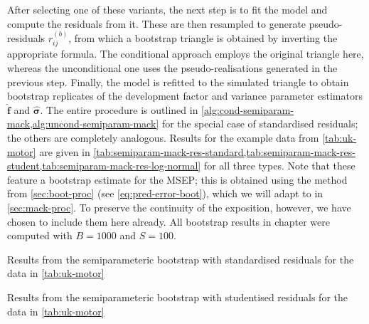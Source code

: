 \documentclass[a4paper]{book}
\begin{document}
After selecting one of these variants, the next step is to fit the model and compute the residuals from it. These are then resampled to generate pseudo-residuals $r^{(b)}_{ij}$, from which a bootstrap triangle is obtained by inverting the appropriate formula. The conditional approach employs the original triangle here, whereas the unconditional one uses the pseudo-realisations generated in the previous step. Finally, the model is refitted to the simulated triangle to obtain bootstrap replicates of the development factor and variance parameter estimators $\widehat{\bm{f}}$ and $\widehat{\bm{\sigma}}$. The entire procedure is outlined in \cref{alg:cond-semiparam-mack,alg:uncond-semiparam-mack} for the special case of standardised residuals; the others are completely analogous. Results for the example data from \cref{tab:uk-motor} are given in \cref{tab:semiparam-mack-res-standard,tab:semiparam-mack-res-student,tab:semiparam-mack-res-log-normal} for all three types. Note that these feature a bootstrap estimate for the MSEP; this is obtained using the method from \cref{sec:boot-proc} (see \cref{eq:pred-error-boot}), which we will adapt to  in \cref{sec:mack-proc}. To preserve the continuity of the exposition, however, we have chosen to include them here already. All bootstrap results in chapter were computed with $B = 1000$ and $S = 100$.

\begin{table}[!htb]
  \begin{subtable}{0.5\linewidth}
    
  \end{subtable}
  \hfill
  \begin{subtable}{0.5\linewidth}
    
  \end{subtable}
  \caption{Results from the semiparameteric bootstrap with standardised residuals for the data in \cref{tab:uk-motor}}
  \label{tab:semiparam-mack-res-standard}
\end{table}

\begin{table}[!htb]
  \begin{subtable}{0.5\linewidth}
    
  \end{subtable}
  \hfill
  \begin{subtable}{0.5\linewidth}
    
  \end{subtable}
  \caption{Results from the semiparameteric bootstrap with studentised residuals for the data in \cref{tab:uk-motor}}
  \label{tab:semiparam-mack-res-student}
\end{table}
\end{document}

